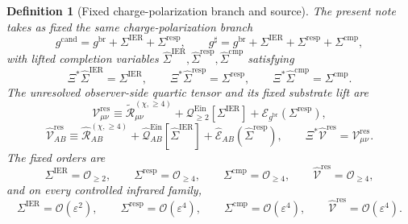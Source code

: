 \documentclass[11pt]{article}
\newcommand{\ObserverMap}{\Xi}
\newcommand{\ObserverMetric}{g^{\mathrm{br}}}
\newcommand{\CandidateMetric}{g^{\mathrm{cand}}}
\newcommand{\CompletedMetric}{g^{\sharp}}
\newcommand{\BaseShift}{\Sigma^{\mathrm{IER}}}
\newcommand{\ResponseShift}{\Sigma^{\mathrm{resp}}}
\newcommand{\CompShift}{\Sigma^{\mathrm{cmp}}}
\newcommand{\BaseLift}{\widehat\Sigma^{\mathrm{IER}}}
\newcommand{\ResponseLift}{\widehat\Sigma^{\mathrm{resp}}}
\newcommand{\CompLift}{\widehat\Sigma^{\mathrm{cmp}}}
\newcommand{\ReLongFour}{\widetilde{\mathcal R}_{\mu\nu}^{(\chi,\ge 4)}}
\newcommand{\ResidualCore}{\mathcal V_{\mu\nu}^{\mathrm{res}}}
\newcommand{\ResidualLift}{\widehat{\mathcal V}^{\mathrm{res}}}
\newcommand{\EinLin}{\mathcal E_{\ObserverMetric}}
\newcommand{\EinQuad}{\mathcal Q_{\ge 2}^{\mathrm{Ein}}}
\newcommand{\epsIR}{\varepsilon}
\newtheorem{definition}{Definition}
\begin{document}
\begin{definition}[Fixed charge-polarization branch and source]
\label{def:fixed}
The present note takes as fixed the same charge-polarization branch
\begin{equation}
\CandidateMetric
=
\ObserverMetric+\BaseShift+\ResponseShift,
\qquad
\CompletedMetric
=
\ObserverMetric+\BaseShift+\ResponseShift+\CompShift,
\label{eq:metrics}
\end{equation}
with lifted completion variables \(\BaseLift,\ResponseLift,\CompLift\) satisfying
\begin{equation}
\ObserverMap^*\BaseLift=\BaseShift,
\qquad
\ObserverMap^*\ResponseLift=\ResponseShift,
\qquad
\ObserverMap^*\CompLift=\CompShift.
\label{eq:lifts}
\end{equation}
The unresolved observer-side quartic tensor and its fixed substrate lift are
\begin{equation}
\ResidualCore
\equiv
\ReLongFour
+\EinQuad[\BaseShift]
+\EinLin(\ResponseShift),
\label{eq:vres}
\end{equation}
\begin{equation}
\ResidualLift_{AB}
\equiv
\widehat{\mathcal R}_{AB}^{(\chi,\ge 4)}
+\widehat{\mathcal Q}_{AB}^{\mathrm{Ein}}[\BaseLift]
+\widehat{\mathcal E}_{AB}(\ResponseLift),
\qquad
\ObserverMap^*\ResidualLift=\ResidualCore.
\label{eq:liftedsource}
\end{equation}
The fixed orders are
\begin{equation}
\BaseShift=\mathcal O_{\ge 2},
\qquad
\ResponseShift=\mathcal O_{\ge 4},
\qquad
\CompShift=\mathcal O_{\ge 4},
\qquad
\ResidualLift=\mathcal O_{\ge 4},
\label{eq:orders}
\end{equation}
and on every controlled infrared family,
\begin{equation}
\BaseShift=\mathcal O(\epsIR^2),
\qquad
\ResponseShift=\mathcal O(\epsIR^4),
\qquad
\CompShift=\mathcal O(\epsIR^4),
\qquad
\ResidualLift=\mathcal O(\epsIR^4).
\label{eq:irorders}
\end{equation}
\end{definition}
\end{document}
